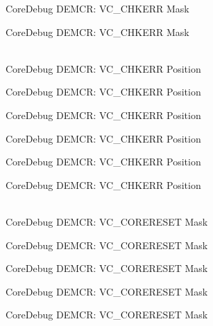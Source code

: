 \begin{DoxyRefList}
\label{deprecated__deprecated000515}%
%
Core\+Debug DEMCR:\+ VC\+\_\+\+CHKERR Mask 

\label{deprecated__deprecated000617}%
%
Core\+Debug DEMCR:\+ VC\+\_\+\+CHKERR Mask  
\item[{\parbox[t]{\linewidth}{Global \doxylink{group__CMSIS__CoreDebug_ga10fc7c53bca904c128bc8e1a03072d50}{Core\+Debug\+\_\+\+DEMCR\+\_\+\+VC\+\_\+\+CHKERR\+\_\+\+Pos} }}]\hfill \\
\label{deprecated__deprecated000063}%
%
Core\+Debug DEMCR:\+ VC\+\_\+\+CHKERR Position 

\label{deprecated__deprecated000207}%
%
Core\+Debug DEMCR:\+ VC\+\_\+\+CHKERR Position 

\label{deprecated__deprecated000349}%
%
Core\+Debug DEMCR:\+ VC\+\_\+\+CHKERR Position 

\label{deprecated__deprecated000425}%
%
Core\+Debug DEMCR:\+ VC\+\_\+\+CHKERR Position 

\label{deprecated__deprecated000514}%
%
Core\+Debug DEMCR:\+ VC\+\_\+\+CHKERR Position 

\label{deprecated__deprecated000616}%
%
Core\+Debug DEMCR:\+ VC\+\_\+\+CHKERR Position  
\item[{\parbox[t]{\linewidth}{Global \doxylink{group__CMSIS__CoreDebug_ga906476e53c1e1487c30f3a1181df9e30}{Core\+Debug\+\_\+\+DEMCR\+\_\+\+VC\+\_\+\+CORERESET\+\_\+\+Msk} }}]\hfill \\
\label{deprecated__deprecated000070}%
%
Core\+Debug DEMCR:\+ VC\+\_\+\+CORERESET Mask 

\label{deprecated__deprecated000138}%
%
Core\+Debug DEMCR:\+ VC\+\_\+\+CORERESET Mask 

\label{deprecated__deprecated000214}%
%
Core\+Debug DEMCR:\+ VC\+\_\+\+CORERESET Mask 

\label{deprecated__deprecated000277}%
%
Core\+Debug DEMCR:\+ VC\+\_\+\+CORERESET Mask 

\label{deprecated__deprecated000356}%
%
Core\+Debug DEMCR:\+ VC\+\_\+\+CORERESET Mask 


\end{DoxyRefList}
